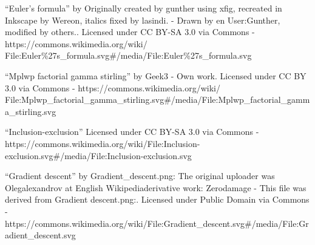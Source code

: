 \documentclass[11pt]{amsart}
\begin{document}
\begin{thebibliography}{9}

``Euler's formula'' by Originally created by gunther using xfig, recreated in Inkscape by Wereon, italics fixed by lasindi. - Drawn by en User:Gunther, modified by others.. Licensed under CC BY-SA 3.0 via Commons - https://commons.wikimedia.org/wiki/\\File:Euler\%27s\_formula.svg\#/media/File:Euler\%27s\_formula.svg

``Mplwp factorial gamma stirling'' by Geek3 - Own work. Licensed under CC BY 3.0 via Commons - https://commons.wikimedia.org/wiki/\\File:Mplwp\_factorial\_gamma\_stirling.svg\#/media/File:Mplwp\_factorial\_gamma\_stirling.svg

``Inclusion-exclusion'' Licensed under CC BY-SA 3.0 via Commons - \\https://commons.wikimedia.org/wiki/File:Inclusion-exclusion.svg\#/media/File:Inclusion-exclusion.svg

``Gradient descent'' by Gradient\_descent.png: The original uploader was Olegalexandrov at English Wikipediaderivative work: Zerodamage - This file was derived from Gradient descent.png:. Licensed under Public Domain via Commons - \\https://commons.wikimedia.org/wiki/File:Gradient\_descent.svg\#/media/File:Gradient\_descent.svg

\end{thebibliography}
\end{document}

